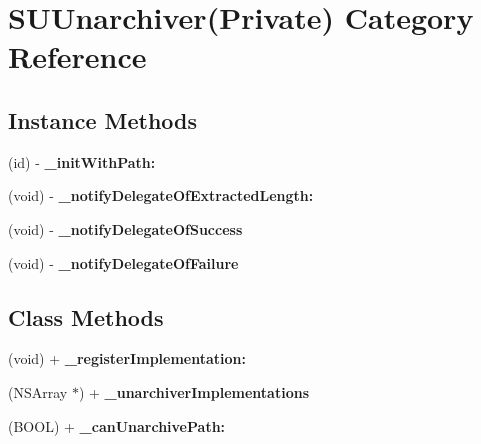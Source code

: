 \hypertarget{category_s_u_unarchiver_07_private_08}{}\section{S\+U\+Unarchiver(Private) Category Reference}
\label{category_s_u_unarchiver_07_private_08}
\subsection*{Instance Methods}
\begin{DoxyCompactItemize}
\item 
\mbox{\label{category_s_u_unarchiver_07_private_08_afaccfec95e57e943d018fa7fa27acbf0}} 
(id) -\/ {\bfseries \+\_\+init\+With\+Path\+:}
\item 
\mbox{\label{category_s_u_unarchiver_07_private_08_a49c191fa54c4b2473e96bf1ce9097176}} 
(void) -\/ {\bfseries \+\_\+notify\+Delegate\+Of\+Extracted\+Length\+:}
\item 
\mbox{\label{category_s_u_unarchiver_07_private_08_a91dfacee19d21e16c4c4169f497fd7e3}} 
(void) -\/ {\bfseries \+\_\+notify\+Delegate\+Of\+Success}
\item 
\mbox{\label{category_s_u_unarchiver_07_private_08_ad0119bd2f95bfacd899d552989427374}} 
(void) -\/ {\bfseries \+\_\+notify\+Delegate\+Of\+Failure}
\end{DoxyCompactItemize}
\subsection*{Class Methods}
\begin{DoxyCompactItemize}
\item 
\mbox{\label{category_s_u_unarchiver_07_private_08_ac0632dd9d46576e8444a705b8cac1260}} 
(void) + {\bfseries \+\_\+register\+Implementation\+:}
\item 
\mbox{\label{category_s_u_unarchiver_07_private_08_a33d5de08bf23c752ff518b4b4146e2c9}} 
(N\+S\+Array $\ast$) + {\bfseries \+\_\+unarchiver\+Implementations}
\item 
\mbox{\label{category_s_u_unarchiver_07_private_08_a71e739bb08f1ed6335e41f9b3bda090a}} 
(B\+O\+OL) + {\bfseries \+\_\+can\+Unarchive\+Path\+:}
\end{DoxyCompactItemize}


